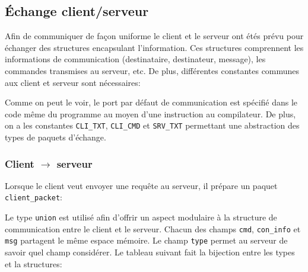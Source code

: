 \documentclass[12pt,french]{article}
\begin{document}
        \subsection{Échange client/serveur} %
        \label{sub:echange-client-serveur}
            Afin de communiquer de façon uniforme le client et le serveur ont étés prévu pour
            échanger des structures encapsulant l'information. Ces structures comprennent les
            informations de communication (destinataire, destinateur, message), les commandes
            transmises au serveur, etc. De plus, différentes constantes communes aux client et
            serveur sont nécessaires:
            
            Comme on peut le voir, le port par défaut de communication est spécifié dans le code
            même du programme au moyen d'une instruction au compilateur. De plus, on a les
            constantes {\tt CLI\_TXT}, {\tt CLI\_CMD} et {\tt SRV\_TXT} permettant une abstraction
            des types de paquets d'échange.

            \subsubsection{Client $\rightarrow$ serveur} %
            \label{ssub:client-serveur}
                Lorsque le client veut envoyer une requête au serveur, il prépare un paquet {\tt
                client\_packet}:
                \lstset{language=c}
                
                Le type {\tt union} est utilisé afin
                d'offrir un aspect modulaire à la structure de communication entre le client et le
                serveur. Chacun des champs {\tt cmd}, {\tt con\_info} et {\tt msg} partagent le même
                espace mémoire. Le champ {\tt type} permet au serveur de savoir quel champ
                considérer. Le tableau suivant fait la bijection entre les types et la structures:
\end{document}
